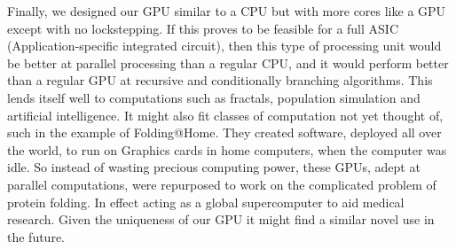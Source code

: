		Finally, we designed our GPU similar to a CPU but with more	cores like a
		GPU except with no lockstepping. If this proves to be feasible for a full
		ASIC (Application-specific integrated circuit), then this type of
		processing unit would be better at parallel processing than a regular CPU,
		and it would perform better than a regular GPU at recursive and
		conditionally branching algorithms. This lends itself well to computations
		such as fractals, population simulation and artificial intelligence. It
		might also fit classes of computation not yet thought of, such in the
		example of Folding@Home\cite{Beberg2009}. They created software, deployed
		all over the world, to run on Graphics cards in home computers, when the
		computer was idle. So instead of wasting precious computing power, these
		GPUs, adept at parallel computations, were repurposed to work on the
		complicated problem of protein folding. In effect acting as a global
		supercomputer to aid medical research. Given the uniqueness of our GPU it
		might find a similar novel use in the future.
